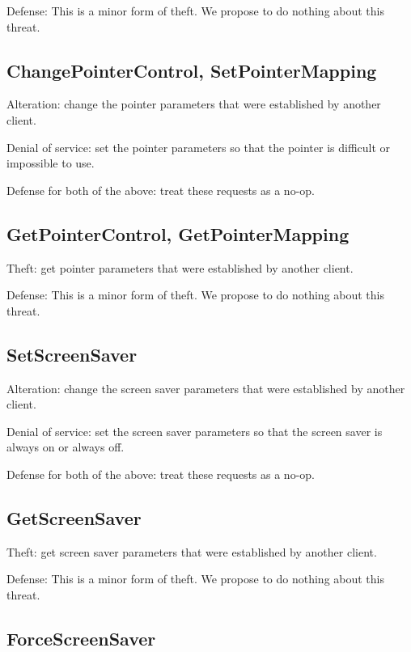 \documentclass{article}
\begin{document}
Defense: This is a minor form of theft.  We propose to do nothing
about this threat.



\subsection{ChangePointerControl, SetPointerMapping}

Alteration: change the pointer parameters that were established by
another client.

Denial of service: set the pointer parameters so that the pointer is
difficult or impossible to use.

Defense for both of the above: treat these requests as a no-op.



\subsection{GetPointerControl, GetPointerMapping}

Theft: get pointer parameters that were established by another client.

Defense: This is a minor form of theft.  We propose to do nothing
about this threat.



\subsection{SetScreenSaver}

Alteration: change the screen saver parameters that were established
by another client.

Denial of service: set the screen saver parameters so that the screen
saver is always on or always off.

Defense for both of the above: treat these requests as a no-op.



\subsection{GetScreenSaver}

Theft: get screen saver parameters that were established by another
client.

Defense: This is a minor form of theft.  We propose to do nothing
about this threat.



\subsection{ForceScreenSaver}
\end{document}
